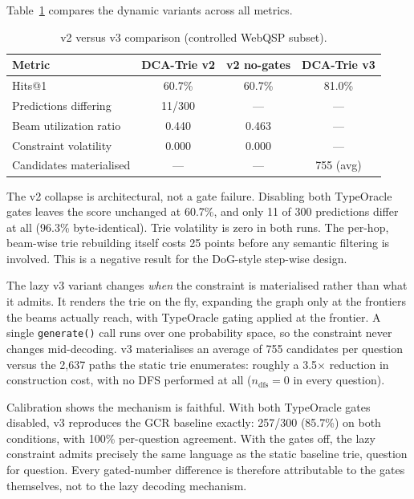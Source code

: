 Table~\ref{tab:rq5} compares the dynamic variants across all metrics.

\begin{table}[htpb]
  \centering
  \caption{v2 versus v3 comparison (controlled WebQSP subset).}
  \label{tab:rq5}
  \begin{tabular}{@{}lccc@{}}
    \toprule
    Metric                  & DCA-Trie v2 & v2 no-gates & DCA-Trie v3 \\
    \midrule
    Hits@1                  & 60.7\%      & 60.7\%      & 81.0\%      \\
    Predictions differing   & 11/300      & ---         & ---         \\
    Beam utilization ratio  & 0.440       & 0.463       & ---         \\
    Constraint volatility   & 0.000       & 0.000       & ---         \\
    Candidates materialised & ---         & ---         & 755 (avg)   \\
    \bottomrule
  \end{tabular}
\end{table}

The v2 collapse is architectural, not a gate failure. Disabling both TypeOracle gates
leaves the score unchanged at 60.7\%, and only 11 of 300 predictions differ at all
(96.3\% byte-identical). Trie volatility is zero in both runs. The per-hop, beam-wise
trie rebuilding itself costs 25 points before any semantic filtering is involved. This
is a negative result for the DoG-style step-wise design.

The lazy v3 variant changes \emph{when} the constraint is materialised rather than
what it admits. It renders the trie on the fly, expanding the graph only at the
frontiers the beams actually reach, with TypeOracle gating applied at the frontier. A
single \texttt{generate()} call runs over one probability space, so the constraint never
changes mid-decoding. v3 materialises an average of 755 candidates per question versus
the 2,637 paths the static trie enumerates: roughly a 3.5$\times$ reduction in
construction cost, with no DFS performed at all ($n_{\text{dfs}} = 0$ in every
question).

Calibration shows the mechanism is faithful. With both TypeOracle gates disabled,
v3 reproduces the GCR baseline exactly: 257/300 (85.7\%) on both conditions, with
100\% per-question agreement. With the gates off, the lazy constraint admits precisely
the same language as the static baseline trie, question for question. Every gated-number
difference is therefore attributable to the gates themselves, not to the lazy decoding
mechanism.

